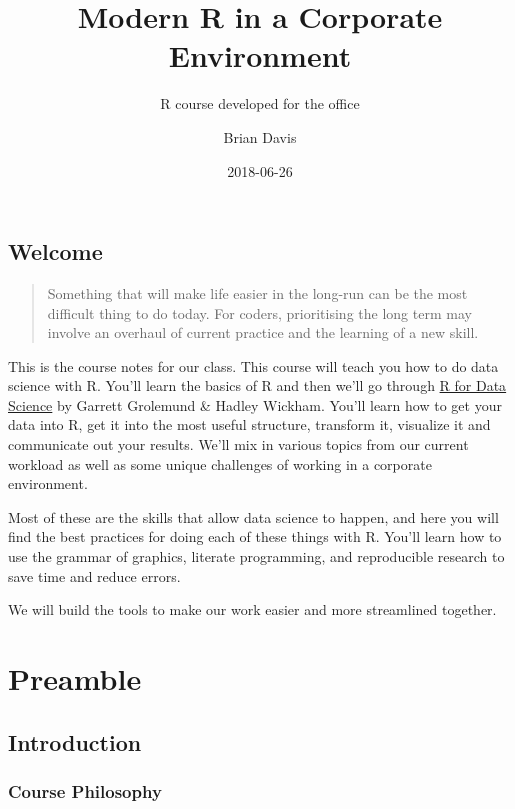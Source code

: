 \documentclass[]{book}
\title{Modern R in a Corporate Environment}
\subtitle{R course developed for the office}
\author{Brian Davis}
\date{2018-06-26}
\theoremstyle{definition}
\theoremstyle{definition}
\theoremstyle{definition}
\theoremstyle{remark}
\begin{document}
\maketitle

{
\setcounter{tocdepth}{1}
\tableofcontents
}
\hypertarget{welcome}{%
\chapter*{Welcome}\label{welcome}}

\begin{quote}
Something that will make life easier in the long-run can be the most
difficult thing to do today. For coders, prioritising the long term may
involve an overhaul of current practice and the learning of a new skill.
\end{quote}

This is the course notes for our class. This course will teach you how
to do data science with R. You'll learn the basics of R and then we'll
go through \href{http://r4ds.had.co.nz/index.html}{R for Data Science}
by Garrett Grolemund \& Hadley Wickham. You'll learn how to get your
data into R, get it into the most useful structure, transform it,
visualize it and communicate out your results. We'll mix in various
topics from our current workload as well as some unique challenges of
working in a corporate environment.

Most of these are the skills that allow data science to happen, and here
you will find the best practices for doing each of these things with R.
You'll learn how to use the grammar of graphics, literate programming,
and reproducible research to save time and reduce errors.

We will build the tools to make our work easier and more streamlined
together.

\hypertarget{part-preamble}{%
\part{Preamble}\label{part-preamble}}

\hypertarget{preamble-intro}{%
\chapter{Introduction}\label{preamble-intro}}

\hypertarget{course-philosophy}{%
\section{Course Philosophy}\label{course-philosophy}}
\end{document}
